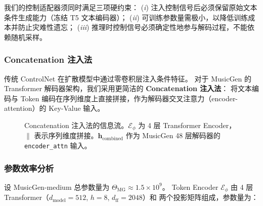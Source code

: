 我们的控制适配器须同时满足三项硬约束：
(\textit{i}) 注入控制信号后必须保留原始文本条件生成能力（冻结 T5 文本编码器）；
(\textit{ii}) 可训练参数量需极小，以降低训练成本并防止灾难性遗忘；
(\textit{iii}) 推理时控制信号必须确定性地参与解码过程，不能依赖随机采样。

\subsubsection{Concatenation 注入法}

传统 ControlNet 在扩散模型中通过零卷积层注入条件特征\cite{controlnet}。
对于 MusicGen 的 Transformer 解码器架构，我们采用更简洁的 \textbf{Concatenation 注入法}：
将文本编码与 Token 编码在序列维度上直接拼接，作为解码器交叉注意力（encoder-attention）的 Key-Value 输入。

\begin{figure}[H]
\centering
{}
\caption{Concatenation 注入法的信息流。$\mathcal{E}_{\phi}$ 为 4 层 Transformer Encoder，
$\|$ 表示序列维度拼接。$\mathbf{h}_{\text{combined}}$ 作为 MusicGen 48 层解码器的
\texttt{encoder\_attn} 输入。}
\label{fig:adapter_arch}
\end{figure}

\subsubsection{参数效率分析}

设 MusicGen-medium 总参数量为 $\Theta_{\text{MG}} \approx 1.5\times 10^9$。
Token Encoder $\mathcal{E}_{\phi}$ 由 4 层 Transformer（$d_{\text{model}}=512$, $h=8$, $d_{\text{ff}}=2048$）和
两个投影矩阵组成，参数量为：

